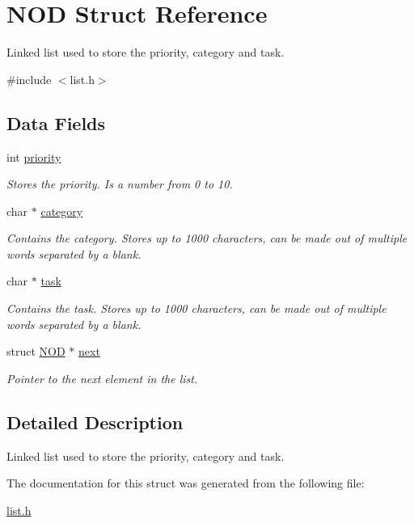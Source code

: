 \hypertarget{struct_n_o_d}{}\section{N\+OD Struct Reference}
\label{struct_n_o_d}


Linked list used to store the priority, category and task.  




{\ttfamily \#include $<$list.\+h$>$}

\subsection*{Data Fields}
\begin{DoxyCompactItemize}
\item 
int \hyperlink{struct_n_o_d_a6a5183df4c54c3e28dc8dc704f2487d5}{priority}\hypertarget{struct_n_o_d_a6a5183df4c54c3e28dc8dc704f2487d5}{}\label{struct_n_o_d_a6a5183df4c54c3e28dc8dc704f2487d5}

\begin{DoxyCompactList}\small\item\em Stores the priority. Is a number from 0 to 10. \end{DoxyCompactList}\item 
char $\ast$ \hyperlink{struct_n_o_d_a71494cb32e3acaab23cde05f1136df5e}{category}\hypertarget{struct_n_o_d_a71494cb32e3acaab23cde05f1136df5e}{}\label{struct_n_o_d_a71494cb32e3acaab23cde05f1136df5e}

\begin{DoxyCompactList}\small\item\em Contains the category. Stores up to 1000 characters, can be made out of multiple words separated by a blank. \end{DoxyCompactList}\item 
char $\ast$ \hyperlink{struct_n_o_d_aa4d42044193f96ecc0d82daab68fb0e6}{task}\hypertarget{struct_n_o_d_aa4d42044193f96ecc0d82daab68fb0e6}{}\label{struct_n_o_d_aa4d42044193f96ecc0d82daab68fb0e6}

\begin{DoxyCompactList}\small\item\em Contains the task. Stores up to 1000 characters, can be made out of multiple words separated by a blank. \end{DoxyCompactList}\item 
struct \hyperlink{struct_n_o_d}{N\+OD} $\ast$ \hyperlink{struct_n_o_d_acde7555eca71d1f823fbaf6f6a1f4670}{next}\hypertarget{struct_n_o_d_acde7555eca71d1f823fbaf6f6a1f4670}{}\label{struct_n_o_d_acde7555eca71d1f823fbaf6f6a1f4670}

\begin{DoxyCompactList}\small\item\em Pointer to the next element in the list. \end{DoxyCompactList}\end{DoxyCompactItemize}


\subsection{Detailed Description}
Linked list used to store the priority, category and task. 

The documentation for this struct was generated from the following file\+:\begin{DoxyCompactItemize}
\item 
\hyperlink{list_8h}{list.\+h}\end{DoxyCompactItemize}
